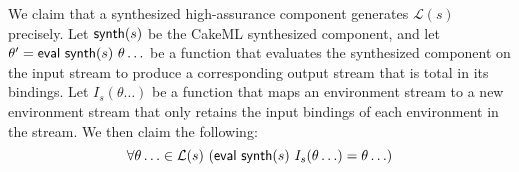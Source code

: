 We claim that a synthesized high-assurance component generates
$\mathcal{L}(s)$ precisely. Let $\mathsf{synth}(s)$ be the CakeML
synthesized component, and let $\theta^\prime
= \mathsf{eval}\ \mathsf{synth}(s)\ \theta\ldots$ be a function that
evaluates the synthesized component on the input stream to produce a
corresponding output stream that is total in its bindings. Let
$I_s(\theta\ldots)$ be a function that maps an environment stream to a
new environment stream that only retains the input bindings of each
environment in the stream. We then claim the following:
%
\[
  \forall \theta\ldots \in \mathcal{L}(s)\ (\konst{eval}\ \konst{synth}(s)\ I_s(\theta\ldots) = \theta\ldots) \\
\]
%
